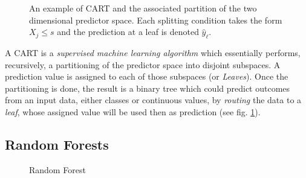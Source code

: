 \documentclass[long, final]{jobim}
\begin{document}
\begin{figure}
\begin{center}
%
  \end{center}
  \caption{An example of CART and the associated partition of the two dimensional predictor space. Each splitting condition takes the form $X_j \leq s$ and the prediction at a leaf is denoted $\hat{y}_\ell$.}
  \label{fig:CART-tree}
\end{figure}

A CART is a \emph{supervised machine learning algorithm} which essentially performs, recursively, a partitioning of the predictor space into disjoint subspaces. A prediction value is assigned to each of those subspaces (or \emph{Leaves}). Once the partitioning is done, the result is a binary tree which could predict outcomes from an input data, either classes or continuous values, by \emph{routing} the data to a \emph{leaf}, whose assigned value will be used then as prediction (see fig. \ref{fig:CART-tree}).

\subsection{Random Forests}
\label{sec:rf-explained}

\begin{figure}
  \begin{center}
    \setlength{\unitlength}{5mm}
    
  \end{center}
  \caption{Random Forest}
  \label{fig:rf-details}
\end{figure}
\end{document}
